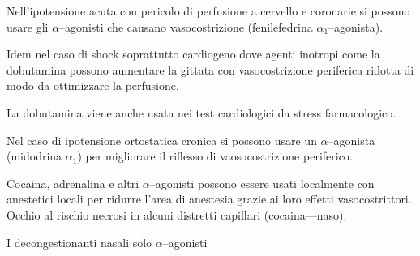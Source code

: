 
Nell'ipotensione acuta con pericolo di perfusione a cervello e coronarie si possono usare gli $\alpha$--agonisti che causano vasocostrizione (fenilefedrina $\alpha_1$--agonista).

Idem nel caso di shock soprattutto cardiogeno dove agenti inotropi come la dobutamina possono aumentare la gittata con vasocostrizione periferica ridotta di modo da ottimizzare la perfusione.

La dobutamina viene anche usata nei test cardiologici da stress farmacologico.

Nel caso di ipotensione ortostatica cronica si possono usare un $\alpha$--agonista (midodrina $\alpha_1$) per migliorare il riflesso di vaosocostrizione periferico.

Cocaina, adrenalina e altri $\alpha$--agonisti possono essere usati localmente con anestetici locali per ridurre l'area di anestesia grazie ai loro effetti vasocostrittori. Occhio al rischio necrosi in alcuni distretti capillari (cocaina---naso).

I decongestionanti nasali solo $\alpha$--agonisti


